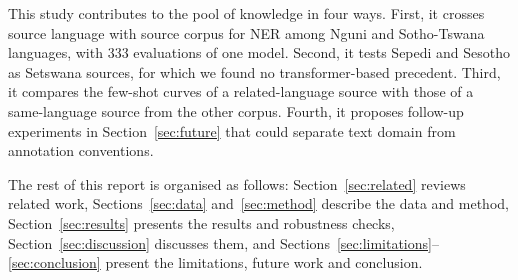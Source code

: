This study contributes to the pool of knowledge in four ways. First, it crosses source language with source corpus for NER among Nguni and Sotho-Tswana languages, with 333 evaluations of one model. Second, it tests Sepedi and Sesotho as Setswana sources, for which we found no transformer-based precedent. Third, it compares the few-shot curves of a related-language source with those of a same-language source from the other corpus. Fourth, it proposes follow-up experiments in Section~\ref{sec:future} that could separate text domain from annotation conventions.

The rest of this report is organised as follows: Section~\ref{sec:related} reviews related work, Sections~\ref{sec:data} and~\ref{sec:method} describe the data and method, Section~\ref{sec:results} presents the results and robustness checks, Section~\ref{sec:discussion} discusses them, and Sections~\ref{sec:limitations}--\ref{sec:conclusion} present the limitations, future work and conclusion.
